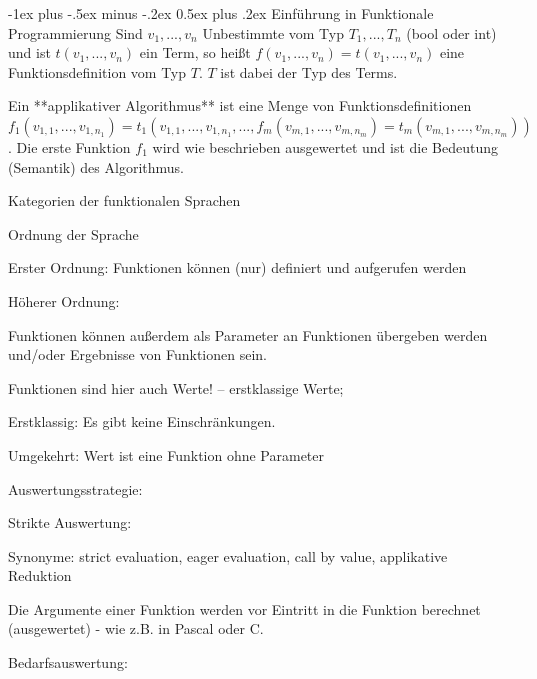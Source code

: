 \documentclass[10pt]{article}
\makeatletter
\renewcommand{\section}{\@startsection{section}{1}{0mm}%
                                {-1ex plus -.5ex minus -.2ex}%
                                {0.5ex plus .2ex}%
                                {\normalfont\large\bfseries}}
\makeatother
\begin{document}
\newpage
\section{Einführung in Funktionale Programmierung}
Sind $v_1, ..., v_n$ Unbestimmte vom Typ $T_1, ..., T_n$ (bool oder int) und ist $t(v_1,...,v_n)$ ein Term, so heißt $f(v_1,...,v_n)= t(v_1,...,v_n)$ eine Funktionsdefinition vom Typ $T$. $T$ ist dabei der Typ des Terms.

Ein **applikativer Algorithmus** ist eine Menge von Funktionsdefinitionen $f_1(v_{1,1}, ..., v_{1,n_1}) = t_1(v_{1,1},...,v_{1,n_1},..., f_m(v_{m,1},...,v_{m,n_m}) = t_m(v_{m,1},..., v_{m,n_m}))$. Die erste Funktion $f_1$ wird wie beschrieben ausgewertet und ist die Bedeutung (Semantik) des Algorithmus.

Kategorien der funktionalen Sprachen
\begin{itemize*}
  \item Ordnung der Sprache
  \begin{itemize*}
    \item Erster Ordnung: Funktionen können (nur) definiert und aufgerufen werden
    \item Höherer Ordnung:
    \begin{itemize*}
      \item Funktionen können außerdem als Parameter an Funktionen übergeben werden und/oder Ergebnisse von Funktionen sein.
      \item Funktionen sind hier auch Werte! -- erstklassige Werte;
      \item Erstklassig: Es gibt keine Einschränkungen.
      \item Umgekehrt: Wert ist eine Funktion ohne Parameter
    \end{itemize*}
  \end{itemize*}
  \item Auswertungsstrategie:
  \begin{itemize*}
    \item Strikte Auswertung:
    \begin{itemize*}
      \item Synonyme: strict evaluation, eager evaluation, call by value, applikative Reduktion
      \item Die Argumente einer Funktion werden vor Eintritt in die Funktion berechnet (ausgewertet) - wie z.B. in Pascal oder C.
    \end{itemize*}
    \item Bedarfsauswertung:
    \begin{itemize*}

\end{itemize*}
\end{itemize*}
\end{itemize*}
\end{document}
